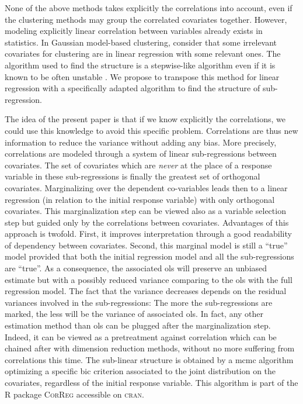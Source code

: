 \documentclass[11pt,a4paper]{article}
\begin{document}
\vspace{3mm}

None of the above methods takes explicitly the correlations into account, even if the clustering methods may group the correlated covariates together. However, modeling explicitly linear correlation between variables already exists in statistics. In Gaussian model-based clustering, \cite{maugis2009variable} consider that some irrelevant covariates for clustering are in linear regression with some relevant ones. The algorithm used to find the structure is a stepwise-like algorithm \cite{raftery2006variable} even if it is known to be often unstable \cite{miller2002subset}. We propose to transpose this method for linear regression with a specifically adapted algorithm to find the structure of sub-regression.
 
The idea of the present paper is that if we know explicitly the correlations, we could use this knowledge to avoid this specific problem. Correlations are thus new information to reduce the variance without adding any bias. More precisely, correlations are modeled through a system of linear sub-regressions between covariates. The set of covariates which are {\it never} at the place of a response variable in these sub-regressions is finally the greatest set of orthogonal covariates. Marginalizing over the dependent co-variables leads then to a linear regression (in relation to the initial response variable) with only orthogonal covariates. This marginalization step can be viewed also as a variable selection step but guided only by the correlations between covariates. Advantages of this approach is twofold. First, it improves interpretation through a good readability of dependency between covariates. Second, this marginal model is still a ``true'' model provided that both the initial regression model and all the sub-regressions are ``true''. As a consequence, the associated {\sc ols} will preserve an unbiased estimate but with a possibly reduced variance comparing to the {\sc ols} with the full regression model. The fact that the variance decreases depends on the residual variances involved in the sub-regressions: The more the sub-regressions are marked, the less will be the variance of associated {\sc ols}. In fact, any other estimation method than {\sc ols} can be plugged after the marginalization step. Indeed, it can be viewed as a pretreatment against correlation which can be chained after with dimension reduction methods, without no more suffering from correlations this time.
The sub-linear structure is obtained by a {\sc mcmc} algorithm optimizing a specific {\sc bic} criterion associated to the joint distribution on the covariates, regardless of the initial response variable. This algorithm is part of the R package \textsc{CorReg} accessible on \textsc{cran}. 
 	
\end{document}
